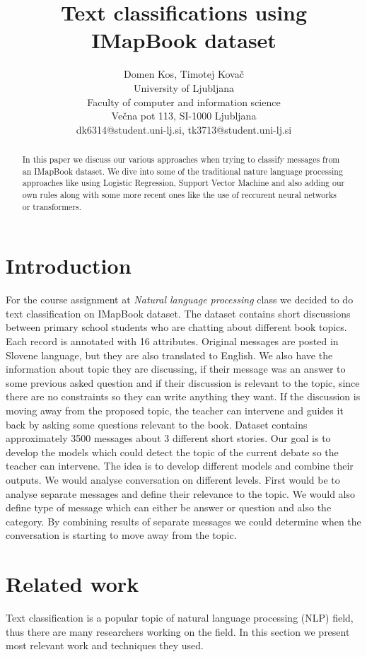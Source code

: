 \documentclass[11pt,a4paper]{article}
\title{Text classifications using IMapBook dataset}
\author{
 Domen Kos, Timotej Kovač \\
 University of Ljubljana \\
 Faculty of computer and information science \\
 Večna pot 113, SI-1000 Ljubljana \\
  {\sf dk6314@student.uni-lj.si, tk3713@student.uni-lj.si} \\
}
\date{}
\begin{document}
\maketitle
 \begin{abstract}
In this paper we discuss our various approaches when trying to classify messages from an IMapBook dataset.
We dive into some of the traditional nature language processing approaches like using Logistic Regression, Support Vector Machine and also adding our own rules along with some more recent ones like the use of reccurent neural networks or transformers.
 \end{abstract}


\section{Introduction}
For the course assignment at \textit{Natural language processing} class we decided to do text classification on IMapBook dataset.
The dataset contains short discussions between primary school students who are chatting about different book topics.
Each record is annotated with 16 attributes.
Original messages are posted in Slovene language, but they are also translated to English.
We also have the information about topic they are discussing, if their message was an answer to some previous asked question and if their discussion is relevant to the topic, since there are no constraints so they can write anything they want.
If the discussion is moving away from the proposed topic, the teacher can intervene and guides it back by asking some questions relevant to the book.
Dataset contains approximately 3500 messages about 3 different short stories.
Our goal is to develop the models which could detect the topic of the current debate so the teacher can intervene.
The idea is to develop different models and combine their outputs.
We would analyse conversation on different levels.
First would be to analyse separate messages and define their relevance to the topic.
We would also define type of message which can either be answer or question and also the category.
By combining results of separate messages we could determine when the conversation is starting to move away from the topic.

\section{Related work}
Text classification is a popular topic of natural language processing (NLP) field, thus there are many researchers working on the field. In this section we present most relevant work and techniques they used.
\end{document}
